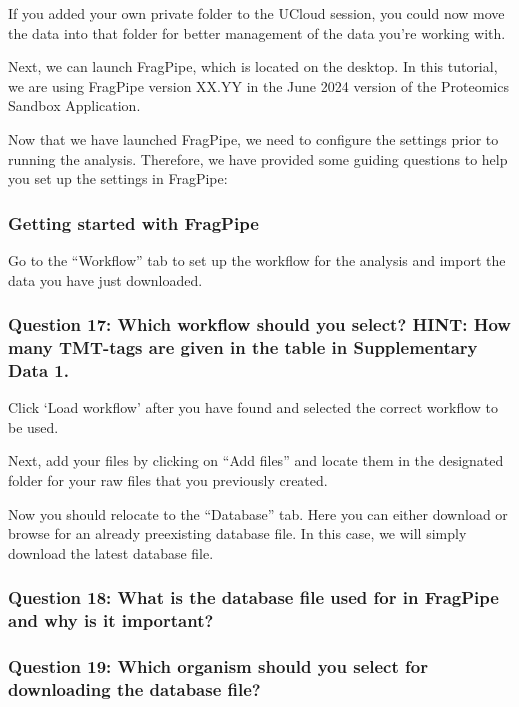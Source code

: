 \documentclass[
  letterpaper,
  DIV=11,
  numbers=noendperiod]{scrartcl}
\begin{document}
If you added your own private folder to the UCloud session, you could
now move the data into that folder for better management of the data
you're working with.

Next, we can launch FragPipe, which is located on the desktop. In this
tutorial, we are using FragPipe version XX.YY in the June 2024 version
of the Proteomics Sandbox Application.

Now that we have launched FragPipe, we need to configure the settings
prior to running the analysis. Therefore, we have provided some guiding
questions to help you set up the settings in FragPipe:

\subsubsection{Getting started with
FragPipe}\label{getting-started-with-fragpipe}

Go to the ``Workflow'' tab to set up the workflow for the analysis and
import the data you have just downloaded.

\subsubsection{Question 17: Which workflow should you select? HINT: How
many TMT-tags are given in the table in Supplementary Data
1.}\label{question-17-which-workflow-should-you-select-hint-how-many-tmt-tags-are-given-in-the-table-in-supplementary-data-1.}

Click `Load workflow' after you have found and selected the correct
workflow to be used.

Next, add your files by clicking on ``Add files'' and locate them in the
designated folder for your raw files that you previously created.

Now you should relocate to the ``Database'' tab. Here you can either
download or browse for an already preexisting database file. In this
case, we will simply download the latest database file.

\subsubsection{Question 18: What is the database file used for in
FragPipe and why is it
important?}\label{question-18-what-is-the-database-file-used-for-in-fragpipe-and-why-is-it-important}

\subsubsection{Question 19: Which organism should you select for
downloading the database
file?}\label{question-19-which-organism-should-you-select-for-downloading-the-database-file}
\end{document}
